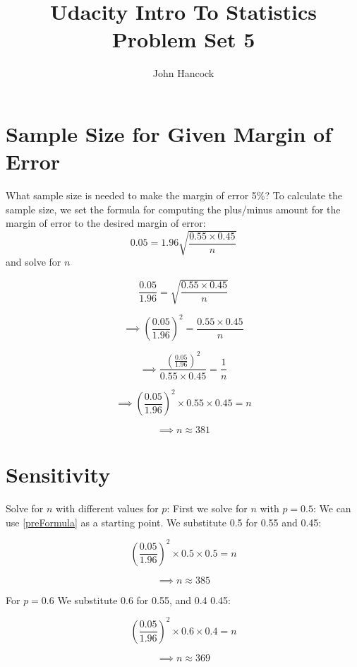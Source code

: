 \documentclass[a4paper,11pt]{article}
\author{John Hancock}
\title{Udacity Intro To Statistics Problem Set 5}
\begin{document}
\maketitle
\tableofcontents
\section{Sample Size for Given Margin of Error}
What sample size is needed to make the margin of error 5\%?
To calculate the sample size, we set the formula for computing the
plus/minus amount for the margin of error to the desired margin of
error:
\begin{equation}
0.05 = 1.96 \sqrt{\frac{0.55 \times 0.45}{n}}
\end{equation}
and solve for $n$

\begin{equation}
\frac{0.05}{1.96} =  \sqrt{\frac{0.55 \times 0.45}{n}}
\end{equation}

\begin{equation}
\implies \left (\frac{0.05}{1.96} \right)^2 =  \frac{0.55 \times 0.45}{n}
\end{equation}

\begin{equation}
\implies \frac{\left (\frac{0.05}{1.96} \right)^2} {0.55 \times 0.45}
=\frac{1}{n}
\end{equation}

\begin{equation}
\implies \left (\frac{0.05}{1.96} \right)^2 \times 0.55 \times 0.45
=n
\end{equation}
\label{preFormula}

\begin{equation}
\implies n \approx 381
\end{equation}


\section{Sensitivity}
Solve for $n$ with different values for $p$:
First we solve for $n$ with $p=0.5$:
We can use \eqref{preFormula} as a starting point.  We substitute 0.5
for 0.55 and 0.45:

\begin{equation}
 \left (\frac{0.05}{1.96} \right)^2 \times 0.5 \times 0.5
=n
\end{equation}


\begin{equation}
\implies n \approx 385
\end{equation}


For $p=0.6$ We substitute 0.6 for 0.55, and 0.4 0.45:

\begin{equation}
 \left (\frac{0.05}{1.96} \right)^2 \times 0.6 \times 0.4
=n
\end{equation}


\begin{equation}
\implies n \approx 369
\end{equation}
\end{document}
